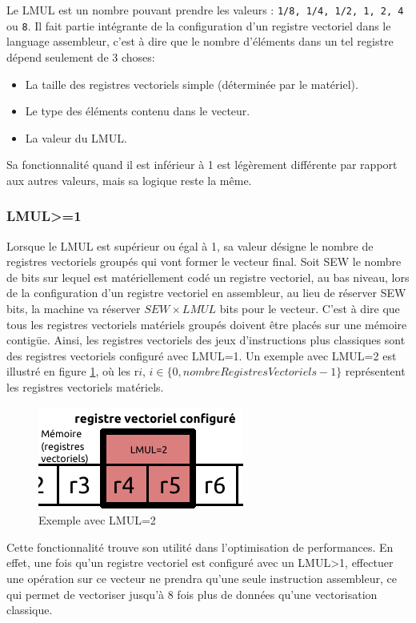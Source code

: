 Le LMUL est un nombre pouvant prendre les valeurs : \texttt{1/8, 1/4, 1/2, 1, 2, 4} ou \texttt{8}. Il fait partie intégrante de la configuration d'un registre vectoriel dans le language assembleur, c'est à dire que le nombre d'éléments dans un tel registre dépend seulement de 3 choses: 
\begin{itemize}
	\item La taille des registres vectoriels simple (déterminée par le matériel).
	\item Le type des éléments contenu dans le vecteur.
	\item La valeur du LMUL.
\end{itemize}

Sa fonctionnalité quand il est inférieur à 1 est légèrement différente par rapport aux autres valeurs, mais sa logique reste la même.

\subsubsection{LMUL>=1}

Lorsque le LMUL est supérieur ou égal à 1, sa valeur désigne le nombre de registres vectoriels groupés qui vont former le vecteur final. Soit SEW le nombre de bits sur lequel est matériellement codé un registre vectoriel, au bas niveau, lors de la configuration d'un registre vectoriel en assembleur, au lieu de réserver SEW bits, la machine va réserver $SEW\times LMUL$ bits pour le vecteur. C'est à dire que tous les registres vectoriels matériels groupés doivent être placés sur une mémoire contigüe. Ainsi, les registres vectoriels des jeux d'instructions plus classiques sont des registres vectoriels configuré avec LMUL=1. Un exemple avec LMUL=2 est illustré en figure \ref{fig:LMUL}, où les r$i$, $i\in \{0, nombreRegistresVectoriels-1\}$ représentent les registres vectoriels matériels.\\


\begin{figure}[H]
    \centering
    \includegraphics[width=0.4\linewidth]{img/LMUL.png}
    \caption{Exemple avec LMUL=2}
    \label{fig:LMUL}
\end{figure}


Cette fonctionnalité trouve son utilité dans l'optimisation de performances. En effet, une fois qu'un registre vectoriel est configuré avec un LMUL>1, effectuer une opération sur ce vecteur ne prendra qu'une seule instruction assembleur, ce qui permet de vectoriser jusqu'à 8 fois plus de données qu'une vectorisation classique. 



